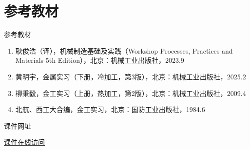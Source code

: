 \documentclass[bigger,aspectratio=169]{beamer}
\begin{document}
\section{参考教材}
\label{sec:org0217aa8}
\begin{frame}[label={sec:org9da2659}]{参考教材}
\begin{enumerate}
\item 耿俊浩（译），机械制造基础及实践（Workshop Processes, Practices and Materials 5th Edition），北京：机械工业出版社，2023.9
\item 黄明宇，金属实习（下册，冷加工，第3版），北京：机械工业出版社，2025.2
\item 柳秉毅，金工实习（上册，热加工，第2版），北京：机械工业出版社，2009.4
\item 北航、西工大合编，金工实习，北京：国防工业出版社，1984.6
\end{enumerate}
\end{frame}
\begin{frame}[label={sec:org5d0f4ce}]{课件网址}
\centering
\vspace{1.5cm}


\href{https://kivinchoa01.github.io/metal-working-practice/}{课件在线访问}
\end{frame}
\end{document}
